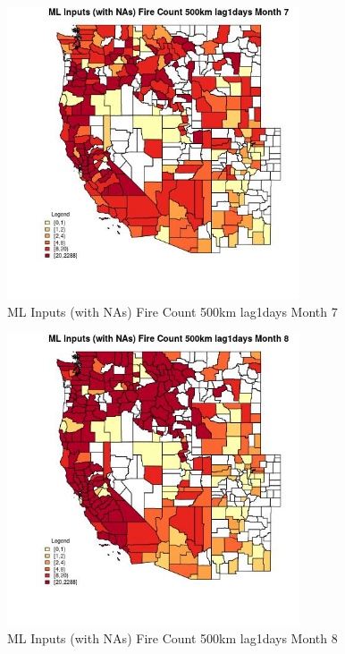 \clearpage 

\begin{figure} 
\centering  
\includegraphics[width=0.77\textwidth]{Code_Outputs/Report_ML_input_PM25_Step4_part_e_de_duplicated_aves_compiled_2019-05-20wNAs_CountyFire_Count_500km_lag1daysmedianMonth7.jpg} 
\caption{\label{fig:Report_ML_input_PM25_Step4_part_e_de_duplicated_aves_compiled_2019-05-20wNAsCountyFire_Count_500km_lag1daysmedianMonth7}ML Inputs (with NAs) Fire Count 500km lag1days Month 7} 
\end{figure} 
 

\begin{figure} 
\centering  
\includegraphics[width=0.77\textwidth]{Code_Outputs/Report_ML_input_PM25_Step4_part_e_de_duplicated_aves_compiled_2019-05-20wNAs_CountyFire_Count_500km_lag1daysmedianMonth8.jpg} 
\caption{\label{fig:Report_ML_input_PM25_Step4_part_e_de_duplicated_aves_compiled_2019-05-20wNAsCountyFire_Count_500km_lag1daysmedianMonth8}ML Inputs (with NAs) Fire Count 500km lag1days Month 8} 
\end{figure} 
 

